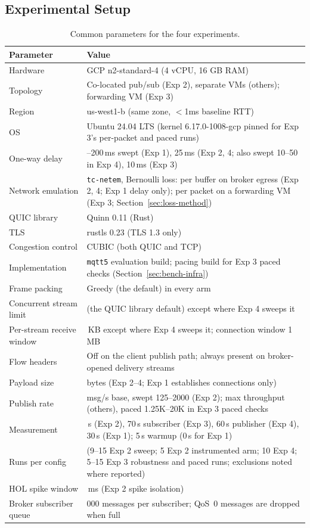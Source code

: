 \documentclass[a4paper,fleqn]{cas-dc}
\begin{document}
\subsection{Experimental Setup}

\begin{table}
\centering
\caption{Common parameters for the four experiments.}
\label{tab:params}
\small
\begin{tabular}{@{}>{\raggedright\arraybackslash}p{}>{\raggedright\arraybackslash}p{}@{}}
\toprule
Parameter & Value \\
\midrule
Hardware & GCP n2-standard-4 (4 vCPU, 16 GB RAM) \\
Topology & Co-located pub/sub (Exp 2), separate VMs (others); forwarding VM (Exp 3) \\
Region & us-west1-b (same zone, $<$1ms baseline RTT) \\
OS & Ubuntu 24.04 LTS (kernel 6.17.0-1008-gcp pinned for Exp 3's per-packet and paced runs) \\
One-way delay & 0--200\,ms swept (Exp 1), 25\,ms (Exp 2, 4; also swept 10--50 in Exp 4), 10\,ms (Exp 3) \\
Network emulation & \texttt{tc-netem}, Bernoulli loss: per buffer on broker egress (Exp 2, 4; Exp 1 delay only); per packet on a forwarding VM (Exp 3; Section~\ref{sec:loss-method}) \\
QUIC library & Quinn 0.11 (Rust) \\
TLS & rustls 0.23 (TLS 1.3 only) \\
Congestion control & CUBIC (both QUIC and TCP) \\
Implementation & \texttt{mqtt5} evaluation build; pacing build for Exp 3 paced checks (Section~\ref{sec:bench-infra}) \\
Frame packing & Greedy (the default) in every arm \\
Concurrent stream limit & 100 (the QUIC library default) except where Exp 4 sweeps it \\
Per-stream receive window & 256\,KB except where Exp 4 sweeps it; connection window 1\,MB \\
Flow headers & Off on the client publish path; always present on broker-opened delivery streams \\
Payload size & 256 bytes (Exp 2--4; Exp 1 establishes connections only) \\
Publish rate & 500 msg/s base, swept 125--2000 (Exp 2); max throughput (others), paced 1.25K--20K in Exp 3 paced checks \\
Measurement & 60\,s (Exp 2), 70\,s subscriber (Exp 3), 60\,s publisher (Exp 4), 30\,s (Exp 1); 5\,s warmup (0\,s for Exp 1) \\
Runs per config & 15 (9--15 Exp 2 sweep; 5 Exp 2 instrumented arm; 10 Exp 4; 5--15 Exp 3 robustness and paced runs; exclusions noted where reported) \\
HOL spike window & 10\,ms (Exp 2 spike isolation) \\
Broker subscriber queue & 10{,}000 messages per subscriber; QoS~0 messages are dropped when full \\
\bottomrule
\end{tabular}
\end{table}
\end{document}

